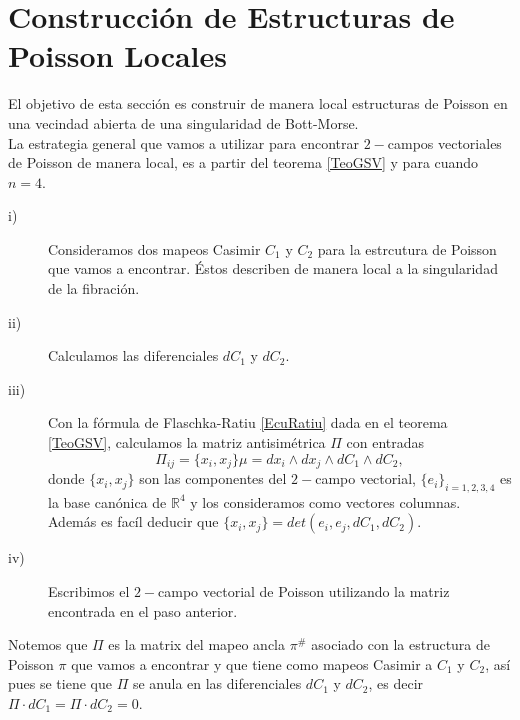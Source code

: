 \documentclass[a4paper,10pt]{book}
\begin{document}
\section{Construcci\'on de Estructuras de Poisson Locales}\label{3.1}
El objetivo de esta secci\'on es construir de manera local estructuras de Poisson en una vecindad abierta de una singularidad de Bott-Morse.\\

La estrategia general que vamos a utilizar para encontrar $2-$campos vectoriales de Poisson de manera local, es a partir del teorema \ref{TeoGSV} y para cuando $n=4$. 
\begin{description}
    \item[i)  ] Consideramos dos mapeos Casimir $C_{1}$ y $C_{2}$ para la estrcutura de Poisson que vamos a encontrar. \'Estos describen de manera local a la singularidad de la fibraci\'on. 
    \item[ii) ] Calculamos las diferenciales $d C_{1}$ y $d C_{2}$.
    \item[iii)] Con la f\'ormula de Flaschka-Ratiu \ref{EcuRatiu} dada en el teorema \ref{TeoGSV}, calculamos la matriz antisim\'etrica $\Pi$ con entradas$$\Pi_{ij} = \{x_{i},x_{j}\}\mu = dx_{i}\wedge dx_{j}\wedge d C_{1}\wedge d C_{2},$$ 
    donde $\{x_{i},x_{j}\}$ son las componentes del $2-$campo vectorial, $\{e_i\}_{i=1,2,3,4}$ es la base can\'onica de $\mathbb{R}^4$ y los consideramos como vectores columnas. Adem\'as es fac\'il deducir que $\{x_{i},x_{j}\}= det(e_{i},e_{j},d C_{1},d C_{2})$. 
    \item[iv) ] Escribimos el $2-$campo vectorial de Poisson utilizando la matriz encontrada en el paso anterior.  
\end{description}
Notemos que $\Pi$ es la matrix del mapeo ancla $\pi^{\#}$ asociado con la estructura de Poisson $\pi$ que vamos a encontrar y que tiene como mapeos Casimir a $C_{1}$ y $C_{2}$, as\'i pues se tiene que $\Pi$ se anula en las diferenciales $d C_{1}$ y $d C_{2}$, es decir $\Pi\cdot dC_{1} =\Pi\cdot dC_{2} = 0$.\\
\end{document}
